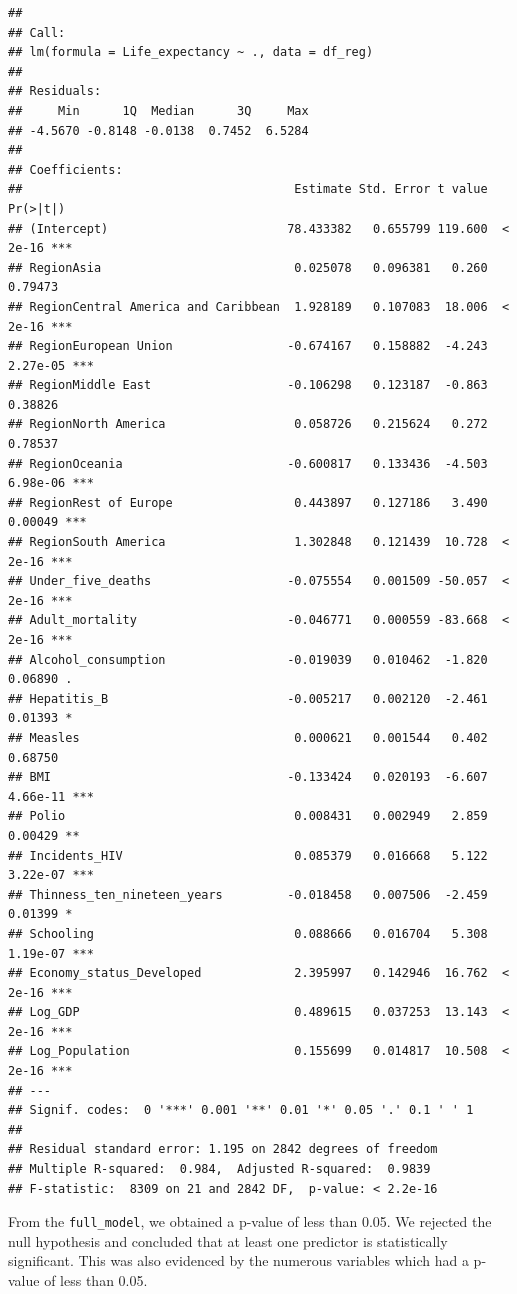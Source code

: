 \documentclass[
  10pt,
]{article}
\begin{document}
\begin{verbatim}
## 
## Call:
## lm(formula = Life_expectancy ~ ., data = df_reg)
## 
## Residuals:
##     Min      1Q  Median      3Q     Max 
## -4.5670 -0.8148 -0.0138  0.7452  6.5284 
## 
## Coefficients:
##                                      Estimate Std. Error t value Pr(>|t|)    
## (Intercept)                         78.433382   0.655799 119.600  < 2e-16 ***
## RegionAsia                           0.025078   0.096381   0.260  0.79473    
## RegionCentral America and Caribbean  1.928189   0.107083  18.006  < 2e-16 ***
## RegionEuropean Union                -0.674167   0.158882  -4.243 2.27e-05 ***
## RegionMiddle East                   -0.106298   0.123187  -0.863  0.38826    
## RegionNorth America                  0.058726   0.215624   0.272  0.78537    
## RegionOceania                       -0.600817   0.133436  -4.503 6.98e-06 ***
## RegionRest of Europe                 0.443897   0.127186   3.490  0.00049 ***
## RegionSouth America                  1.302848   0.121439  10.728  < 2e-16 ***
## Under_five_deaths                   -0.075554   0.001509 -50.057  < 2e-16 ***
## Adult_mortality                     -0.046771   0.000559 -83.668  < 2e-16 ***
## Alcohol_consumption                 -0.019039   0.010462  -1.820  0.06890 .  
## Hepatitis_B                         -0.005217   0.002120  -2.461  0.01393 *  
## Measles                              0.000621   0.001544   0.402  0.68750    
## BMI                                 -0.133424   0.020193  -6.607 4.66e-11 ***
## Polio                                0.008431   0.002949   2.859  0.00429 ** 
## Incidents_HIV                        0.085379   0.016668   5.122 3.22e-07 ***
## Thinness_ten_nineteen_years         -0.018458   0.007506  -2.459  0.01399 *  
## Schooling                            0.088666   0.016704   5.308 1.19e-07 ***
## Economy_status_Developed             2.395997   0.142946  16.762  < 2e-16 ***
## Log_GDP                              0.489615   0.037253  13.143  < 2e-16 ***
## Log_Population                       0.155699   0.014817  10.508  < 2e-16 ***
## ---
## Signif. codes:  0 '***' 0.001 '**' 0.01 '*' 0.05 '.' 0.1 ' ' 1
## 
## Residual standard error: 1.195 on 2842 degrees of freedom
## Multiple R-squared:  0.984,  Adjusted R-squared:  0.9839 
## F-statistic:  8309 on 21 and 2842 DF,  p-value: < 2.2e-16
\end{verbatim}

From the \texttt{full\_model}, we obtained a p-value of less than 0.05.
We rejected the null hypothesis and concluded that at least one
predictor is statistically significant. This was also evidenced by the
numerous variables which had a p-value of less than 0.05.\\
\end{document}
